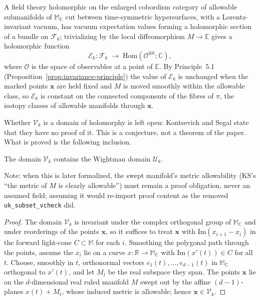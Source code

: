 \begin{definition}
  A field theory holomorphic on the enlarged cobordism category of allowable
  submanifolds of $\mathbb M_{\mathbb C}$ cut between time-symmetric hypersurfaces, with
  a Lorentz-invariant vacuum, has vacuum expectation values forming a holomorphic
  section of a bundle on $\mathcal F_k$; trivializing by the local diffeomorphism
  $M \to \mathbb E$ gives a holomorphic function
  \[ \mathcal E_k \colon \mathcal F_k \;\longrightarrow\;
     \mathrm{Hom}(\mathcal O^{\otimes k}; \mathbb C), \]
  where $\mathcal O$ is the space of observables at a point of $\mathbb E$. By
  Principle~5.1 (Proposition~\ref{prop:invariance-principle}) the value of
  $\mathcal E_k$ is unchanged when the marked points $\mathbf x$ are held fixed and $M$
  is moved smoothly within the allowable class, so $\mathcal E_k$ is constant on the
  connected components of the fibres of $\pi$, the isotopy classes of allowable
  manifolds through $\mathbf x$.
\end{definition}

Whether $\mathcal V_k$ is a domain of holomorphy is left open: Kontsevich and Segal
state that they have no proof of it. This is a conjecture, not a theorem of the paper.
What is proved is the following inclusion.

\begin{proposition}
  \label{prop:Vk-contains-Uk}
  \notready
  The domain $\mathcal V_k$ contains the Wightman domain $\mathcal U_k$.

  Note: when this is later formalized, the swept manifold's metric allowability (KS's ``the
  metric of $M$ is clearly allowable'') must remain a proof obligation, never an assumed
  field; assuming it would re-import proof content as the removed \texttt{uk\_subset\_vcheck}
  did.
\end{proposition}

\begin{proof}
  The domain $\mathcal V_k$ is invariant under the complex orthogonal group of
  $\mathbb M_{\mathbb C}$ and under reorderings of the points $\mathbf x$, so it
  suffices to treat $\mathbf x$ with $\mathrm{Im}(x_{i+1} - x_i)$ in the forward
  light-cone $C \subset \mathbb M$ for each $i$. Smoothing the polygonal path through
  the points, assume the $x_i$ lie on a curve
  $x \colon \mathbb R \to \mathbb M_{\mathbb C}$ with $\mathrm{Im}(x'(t)) \in C$ for all
  $t$. Choose, smoothly in $t$, orthonormal vectors
  $e_1(t), \ldots, e_{d-1}(t)$ in $\mathbb M_{\mathbb C}$ orthogonal to $x'(t)$, and let
  $M_t$ be the real subspace they span. The points $\mathbf x$ lie on the
  $d$-dimensional real ruled manifold $M$ swept out by the affine $(d-1)$-planes
  $x(t) + M_t$, whose induced metric is allowable; hence $\mathbf x \in \mathcal V_k$.
\end{proof}

